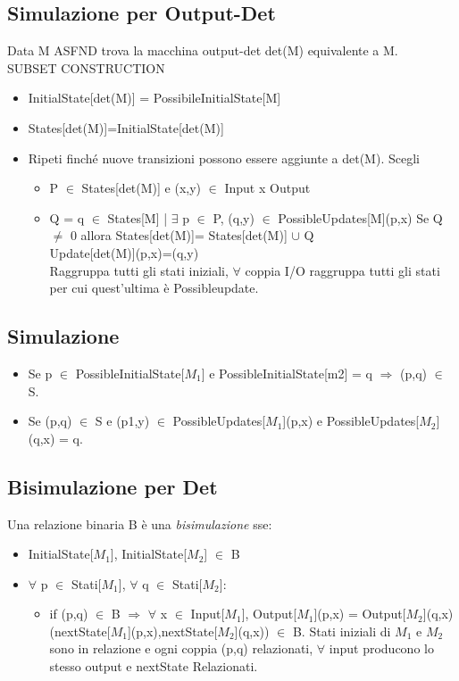 \documentclass[a4paper, 11pt]{article}
\begin{document}
\subsection{Simulazione per Output-Det}Data M ASFND trova la macchina output-det det(M) equivalente a M.\\ SUBSET CONSTRUCTION 
\begin{itemize}
\item InitialState[det(M)] = PossibileInitialState[M]
\item States[det(M)]={InitialState[det(M)]}
\item Ripeti finché nuove transizioni possono essere aggiunte a det(M). Scegli
\begin{itemize}
\item P $\in$ States[det(M)] e (x,y) $\in$ Input x Output
\item Q = {q $\in$ States[M] | $\exists$ p $\in$ P, (q,y) $\in$ PossibleUpdates[M](p,x)}
Se Q $\ne$ 0 allora States[det(M)]= States[det(M)] $\cup$ {Q}\\
Update[det(M)](p,x)=(q,y)\\
Raggruppa tutti gli stati iniziali, $\forall$ coppia I/O raggruppa tutti gli stati per cui quest'ultima è Possibleupdate.
\end{itemize}
\end{itemize}
\subsection{Simulazione}
\begin{itemize}
\item Se p $\in$ PossibleInitialState[$M_1$] e PossibleInitialState[m2] = {q} $\Rightarrow$ (p,q) $\in$ S.
\item Se (p,q) $\in$ S e (p1,y) $\in$ PossibleUpdates[$M_1$](p,x) e PossibleUpdates[$M_2$](q,x) = {q}. 
\end{itemize}
\subsection{Bisimulazione per Det} Una relazione binaria B è una \emph{bisimulazione} sse:
\begin{itemize}
\item InitialState[$M_1$], InitialState[$M_2$] $\in$ B 
\item $\forall$ p $\in$ Stati[$M_1$], $\forall$ q $\in$ Stati[$M_2$]:
\begin{itemize}
\item if (p,q) $\in$ B $\Rightarrow$ $\forall$ x $\in$ Input[$M_1$], Output[$M_1$](p,x) = Output[$M_2$](q,x)\\
(nextState[$M_1$](p,x),nextState[$M_2$](q,x)) $\in$ B.
Stati iniziali di $M_1$ e $M_2$ sono in relazione e ogni coppia (p,q) relazionati, $\forall$ input producono lo stesso output e nextState Relazionati.
\end{itemize}
\end{itemize}
\end{document}
